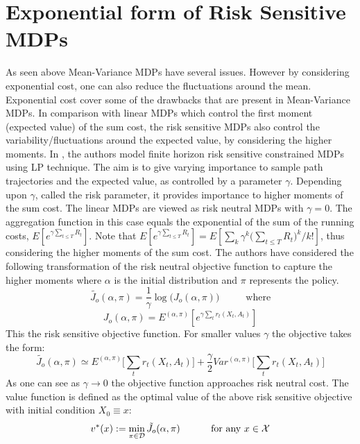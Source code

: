 \documentclass[11pt,a4paper,oneside]{report}
\begin{document}
\section{Exponential form of Risk Sensitive MDPs}
As seen above Mean-Variance MDPs have several issues. However by considering exponential cost, one can also reduce the fluctuations around the mean. Exponential cost cover some of the drawbacks that are present in Mean-Variance MDPs.
In comparison with linear MDPs which control the first moment (expected value) of the sum cost, the risk sensitive MDPs also control the variability/fluctuations around the expected value, by considering the higher moments. In \cite{kumar2015finite}, the authors model finite horizon risk sensitive constrained MDPs using LP technique.  The aim is to give varying importance to sample path trajectories and the expected value, as controlled by a parameter $\gamma$. Depending upon $\gamma$, called the risk parameter, it provides importance to higher moments of the sum cost. The linear MDPs are viewed as risk neutral MDPs with $\gamma=0$. The aggregation function in this case equals the exponential of the sum of the running costs, $E[e^{\gamma {\sum_{t\leq T}R_t}} ]$. Note that $E[e^{\gamma {\sum_{t\leq T}R_t}} ]= E[{\sum_k \gamma ^k {(\sum_{t\leq T}{R_t}})^{k}}/{k!}]$, thus considering the higher moments of the sum cost.
The authors have considered the following transformation of the risk neutral objective function to capture the higher moments where $\alpha$ is the initial distribution and $\pi$ represents the policy.
\begin{equation}
\tilde{J_o}(\alpha,\pi) = \frac{1}{\gamma}\log\big(J_o(\alpha,\pi)\big) \hspace{1cm} \text{  where}
\end{equation}
\begin{equation}
J_o(\alpha,\pi) = E^{(\alpha,\pi)}[e^{\gamma \sum_t r_t(X_t,A_t)}] 
\end{equation}
This the risk sensitive objective function. For smaller values $\gamma$ the objective takes the form:
\begin{equation}
\tilde{J_o}(\alpha,\pi) \simeq E^{(\alpha,\pi)}\Big[ \sum_t r_t(X_t,A_t)\Big] + \frac{\gamma}{2}Var^{(\alpha,\pi)}\Big[\sum_t r_t(X_t,A_t)\Big] 
\end{equation} 
As one can see as $\gamma \rightarrow 0$ the objective function approaches risk neutral cost. The value function is defined as the optimal value of the above risk sensitive objective with initial condition $X_0\equiv x$:
\begin{equation}
v^*(x):=\min_{\pi\in\cal{D}}\tilde{J_o}(\alpha,\pi)\hspace{1cm}  \text {  for any } x\in \cal{X}
\end{equation}
\end{document}
